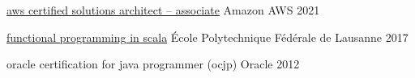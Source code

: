 





\begin{cventries}

    \cventry
    {\href{https://www.credly.com/badges/e5761b98-edf5-44ec-bb32-24f18672e7de/public_url}{aws certified solutions architect – associate}}
    {\hspace{0.5em}Amazon AWS} %
    {}
    {2021}
    {}
    {}
    {}

    \cventry
    {\href{https://www.coursera.org/account/accomplishments/specialization/9NNUCHVNV36F}{functional programming in scala}}
    {\hspace{0.5em}École Polytechnique Fédérale de Lausanne} %
    {}
    {2017}
    {}
    {}
    {}

    \cventry
    {oracle certification for java programmer (ocjp)} %
    {\hspace{0.5em}Oracle} %
    {}
    {2012} %
    {}
    {}
    {}


\end{cventries}
